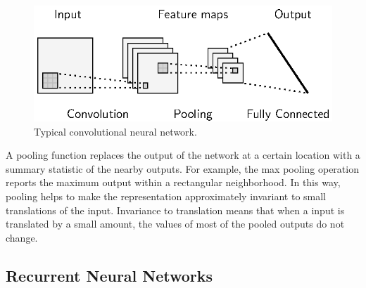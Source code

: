 \documentclass{scrartcl}
\begin{document}
\begin{figure}[htbp]
\centering
\includegraphics[scale=1]{figures/cnn.eps}
\caption{Typical convolutional neural network. }
\label{fig:typical_cnn}
\end{figure}

A pooling function replaces the output of the network at a certain location with a summary statistic of the nearby outputs. For example, the max pooling \cite{Zhou1988} operation reports the maximum output within a rectangular neighborhood. In this way, pooling helps to make the representation approximately invariant to small translations of the input. Invariance to translation means that when a input is translated by a small amount, the values of most of the pooled outputs do not change.




\subsection{Recurrent Neural Networks}
\end{document}
